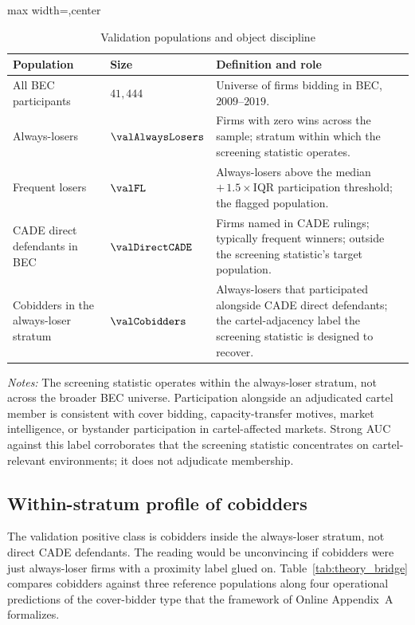 \begin{table}[htbp]
\centering
\caption{Validation populations and object discipline}
\label{tab:cade_populations}
\footnotesize
\begin{adjustbox}{max width=\textwidth,center}
\begin{tabular}{p{4.0cm}p{2.0cm}p{6.5cm}}
\toprule
Population & Size & Definition and role \\
\midrule
All BEC participants & $41{,}444$ & Universe of firms bidding in BEC, $2009$--$2019$. \\
Always-losers & $\valAlwaysLosers$ & Firms with zero wins across the sample; stratum within which the screening statistic operates. \\
Frequent losers & $\valFL$ & Always-losers above the median $+\,1.5\!\times$IQR participation threshold; the flagged population. \\
CADE direct defendants in BEC & $\valDirectCADE$ & Firms named in CADE rulings; typically frequent winners; outside the screening statistic's target population. \\
Cobidders in the always-loser stratum & $\valCobidders$ & Always-losers that participated alongside CADE direct defendants; the cartel-adjacency label the screening statistic is designed to recover. \\
\bottomrule
\end{tabular}
\end{adjustbox}

\smallskip
{\footnotesize\textit{Notes:} The screening statistic operates
within the always-loser stratum, not across the broader BEC
universe. Participation alongside an adjudicated cartel member
is consistent with cover bidding, capacity-transfer motives,
market intelligence, or bystander participation in
cartel-affected markets. Strong AUC against this label
corroborates that the screening statistic concentrates on
cartel-relevant environments; it does not adjudicate
membership.\par}
\end{table}

\subsection{Within-stratum profile of cobidders}
\label{sec:cade_bridge}

The validation positive class is cobidders inside the always-loser
stratum, not direct CADE defendants. The reading would be
unconvincing if cobidders were just always-loser firms with a
proximity label glued on. Table~\ref{tab:theory_bridge} compares
cobidders against three reference populations along four
operational predictions of the cover-bidder type that the framework
of Online Appendix~A formalizes.

